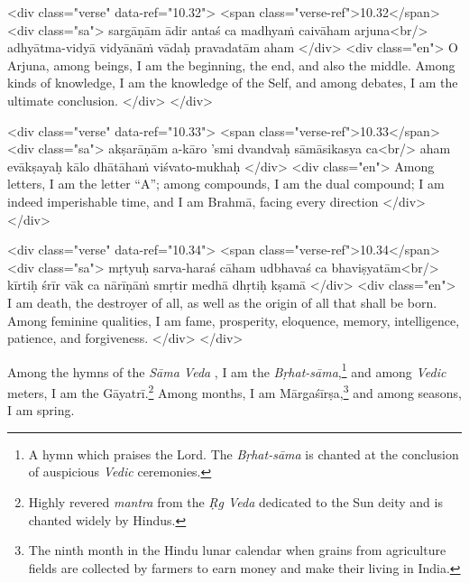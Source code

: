 \begin{html}
<div class="verse" data-ref="10.32">
  <span class="verse-ref">10.32</span>
  <div class="sa">
    sargāṇām ādir antaś ca madhyaṁ caivāham arjuna<br/>
    adhyātma-vidyā vidyānāṁ vādaḥ pravadatām aham
  </div>
  <div class="en">
    O Arjuna, among beings, I am the beginning, the end, and also the middle. Among kinds of knowledge, I am the knowledge of the Self, and among debates, I am the ultimate conclusion.
  </div>
</div>
\end{html}



\begin{html}
<div class="verse" data-ref="10.33">
  <span class="verse-ref">10.33</span>
  <div class="sa">
    akṣarāṇām a-kāro ’smi dvandvaḥ sāmāsikasya ca<br/>
    aham evākṣayaḥ kālo dhātāhaṁ viśvato-mukhaḥ
  </div>
  <div class="en">
    Among letters, I am the letter \enquote{A}; among compounds, I am the dual compound; I am indeed imperishable time, and I am Brahmā, facing every direction
  </div>
</div>
\end{html}



\begin{html}
<div class="verse" data-ref="10.34">
  <span class="verse-ref">10.34</span>
  <div class="sa">
    mṛtyuḥ sarva-haraś cāham udbhavaś ca bhaviṣyatām<br/>
    kīrtiḥ śrīr vāk ca nārīṇāṁ smṛtir medhā dhṛtiḥ kṣamā
  </div>
  <div class="en">
    I am death, the destroyer of all, as well as the origin of all that shall be born. Among feminine qualities, I am fame, prosperity, eloquence, memory, intelligence, patience, and forgiveness.
  </div>
</div>
\end{html}


{Among the hymns of the \textit{Sāma Veda} , I am the \textit{Bṛhat-sāma},\footnote{A hymn which praises the Lord. The \textit{Bṛhat-sāma} is chanted at the conclusion of auspicious \textit{Vedic} ceremonies.} and among \textit{Vedic} meters, I am the Gāyatrī.\footnote{Highly revered \textit{mantra} from the \textit{Ṛg Veda} dedicated to the Sun deity and is chanted widely by Hindus.} Among months, I am Mārgaśīrṣa,\footnote{The ninth month in the Hindu lunar calendar when grains from agriculture fields are collected by farmers to earn money and make their living in India.} and among seasons, I am spring.}


